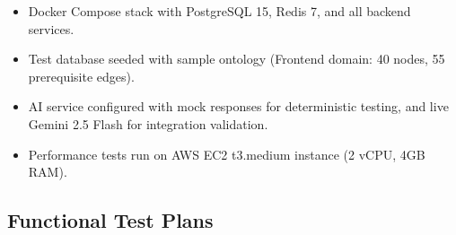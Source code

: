 \begin{itemize}
    \item Docker Compose stack with PostgreSQL 15, Redis 7, and all backend services.
    \item Test database seeded with sample ontology (Frontend domain: 40 nodes, 55 prerequisite edges).
    \item AI service configured with mock responses for deterministic testing, and live Gemini 2.5 Flash for integration validation.
    \item Performance tests run on AWS EC2 t3.medium instance (2 vCPU, 4GB RAM).
\end{itemize}

\subsection{Functional Test Plans}
\label{sec:func-test-plans}

